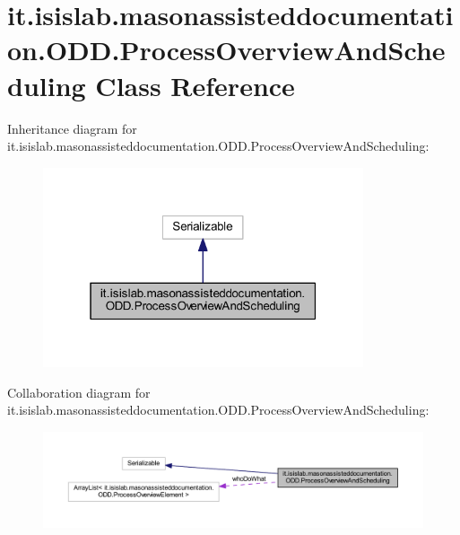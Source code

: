 \hypertarget{classit_1_1isislab_1_1masonassisteddocumentation_1_1_o_d_d_1_1_process_overview_and_scheduling}{\section{it.\-isislab.\-masonassisteddocumentation.\-O\-D\-D.\-Process\-Overview\-And\-Scheduling Class Reference}
\label{classit_1_1isislab_1_1masonassisteddocumentation_1_1_o_d_d_1_1_process_overview_and_scheduling}
}


Inheritance diagram for it.\-isislab.\-masonassisteddocumentation.\-O\-D\-D.\-Process\-Overview\-And\-Scheduling\-:\nopagebreak
\begin{figure}[H]
\begin{center}
\leavevmode
\includegraphics[width=268pt]{classit_1_1isislab_1_1masonassisteddocumentation_1_1_o_d_d_1_1_process_overview_and_scheduling__inherit__graph}
\end{center}
\end{figure}


Collaboration diagram for it.\-isislab.\-masonassisteddocumentation.\-O\-D\-D.\-Process\-Overview\-And\-Scheduling\-:\nopagebreak
\begin{figure}[H]
\begin{center}
\leavevmode
\includegraphics[width=350pt]{classit_1_1isislab_1_1masonassisteddocumentation_1_1_o_d_d_1_1_process_overview_and_scheduling__coll__graph}
\end{center}
\end{figure}
